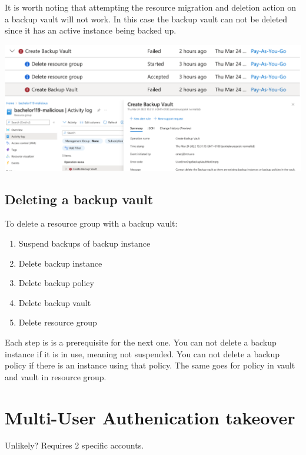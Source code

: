 It is worth noting that attempting the resource migration and deletion action on a backup vault will not work. In this case the backup vault can not be deleted since it has an active instance being backed up. 

\includegraphics[scale=.7]{figures/backup-migration.png}

\subsection{Deleting a backup vault}
To delete a resource group with a backup vault:
\begin{enumerate}
    \item Suspend backups of backup instance
    \item Delete backup instance
    \item Delete backup policy
    \item Delete backup vault
    \item Delete resource group
\end{enumerate}
 Each step is is a prerequisite for the next one. You can not delete a backup instance if it is in use, meaning not suspended. You can not delete a backup policy if there is an instance using that policy. The same goes for policy in vault and vault in resource group.

% 

%






\section{Multi-User Authenication takeover}
Unlikely?
Requires 2 specific accounts.
